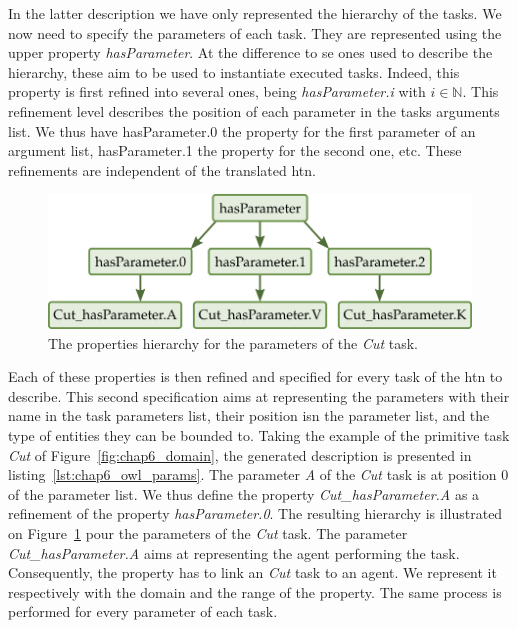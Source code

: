 In the latter description we have only represented the hierarchy of the tasks. We now need to specify the parameters of each task. They are represented using the upper property \textit{hasParameter}. At the difference to se ones used to describe the hierarchy, these aim to be used to instantiate executed tasks. Indeed, this property is first refined into several ones, being \textit{hasParameter.i} with $i \in \mathbb{N}$. This refinement level describes the position of each parameter in the tasks arguments list. We thus have hasParameter.0 the property for the first parameter of an argument list, hasParameter.1 the property for the second one, etc. These refinements are independent of the translated \acrshort{htn}.

\begin{figure}[h!]
\centering
\includegraphics[scale=0.4]{figures/chapter6/rbox_params.png}
\caption{\label{fig:chap6_rbox_params} The properties hierarchy for the parameters of the \textit{Cut} task.}
\end{figure}

Each of these properties is then refined and specified for every task of the \acrshort{htn} to describe. This second specification aims at representing the parameters with their name in the task parameters list, their position isn the parameter list, and the type of entities they can be bounded to. Taking the example of the primitive task \textit{Cut} of Figure~\ref{fig:chap6_domain}, the generated description is presented in listing~\ref{lst:chap6_owl_params}. The parameter \textit{A} of the \textit{Cut} task is at position 0 of the parameter list. We thus define the property \textit{Cut\_hasParameter.A} as a refinement of the property \textit{hasParameter.0}. The resulting hierarchy is illustrated on Figure~\ref{fig:chap6_rbox_params} pour the parameters of the \textit{Cut} task. The parameter \textit{Cut\_hasParameter.A} aims at representing the agent performing the task. Consequently, the property has to link an \textit{Cut} task to an agent. We represent it respectively with the domain and the range of the property. The same process is performed for every parameter of each task.

